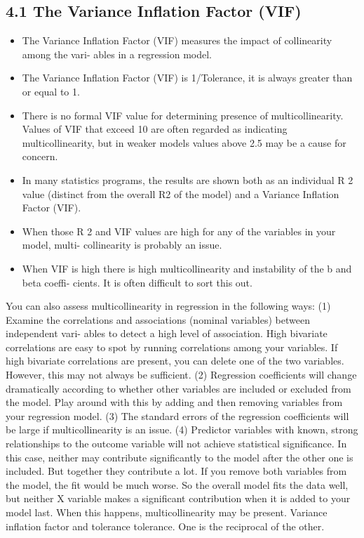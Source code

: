 \documentclass[]{report}
\begin{document}
\subsection{4.1 The Variance Inflation Factor (VIF)}
\begin{itemize}
\item The Variance Inflation Factor (VIF) measures the impact of collinearity among the vari-
ables in a regression model.
\item The Variance Inflation Factor (VIF) is 1/Tolerance, it is always greater than or equal to
1.
\item There is no formal VIF value for determining presence of multicollinearity. Values of VIF
that exceed 10 are often regarded as indicating multicollinearity, but in weaker models
values above 2.5 may be a cause for concern.
\item In many statistics programs, the results are shown both as an individual R 2 value (distinct
from the overall R2 of the model) and a Variance Inflation Factor (VIF).
\item When those R 2 and VIF values are high for any of the variables in your model, multi-
collinearity is probably an issue.
\item When VIF is high there is high multicollinearity and instability of the b and beta coeffi-
cients. It is often difficult to sort this out.
\end{itemize}
You can also assess multicollinearity in regression in the following ways:
(1) Examine the correlations and associations (nominal variables) between independent vari-
ables to detect a high level of association. High bivariate correlations are easy to spot by
running correlations among your variables. If high bivariate correlations are present, you
can delete one of the two variables. However, this may not always be sufficient.
(2) Regression coefficients will change dramatically according to whether other variables are
included or excluded from the model. Play around with this by adding and then removing
variables from your regression model.
(3) The standard errors of the regression coefficients will be large if multicollinearity is an
issue.
(4) Predictor variables with known, strong relationships to the outcome variable will not
achieve statistical significance. In this case, neither may contribute significantly to the
model after the other one is included. But together they contribute a lot. If you remove
both variables from the model, the fit would be much worse. So the overall model fits
the data well, but neither X variable makes a significant contribution when it is added to
your model last. When this happens, multicollinearity may be present.
Variance inflation factor and tolerance tolerance. One is the reciprocal of the other.
\end{document}
